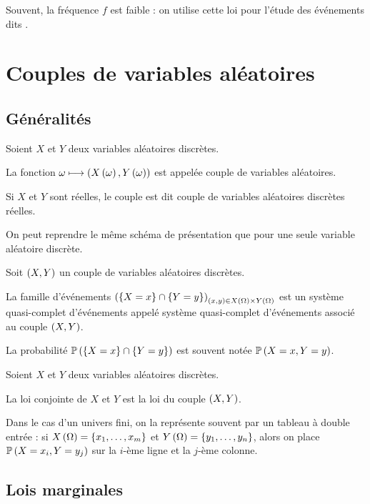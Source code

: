 Souvent, la fréquence \(f\) est faible : on utilise cette loi pour l'étude des événements dits .

\section{Couples de variables aléatoires}

\subsection{Généralités}

\begin{defi}
Soient \(X\) et \(Y\) deux variables aléatoires discrètes.

La fonction \(\omega\longmapsto\left(X\left(\omega\right),Y\left(\omega\right)\right)\) est appelée couple de variables aléatoires.

Si \(X\) et \(Y\) sont réelles, le couple est dit couple de variables aléatoires discrètes réelles.
\end{defi}

On peut reprendre le même schéma de présentation que pour une seule variable aléatoire discrète.

\begin{prop}
Soit \(\left(X,Y\right)\) un couple de variables aléatoires discrètes.

La famille d'événements \(\left(\left\lbrace X=x\right\rbrace\cap\left\lbrace Y=y\right\rbrace\right)_{\left(x,y\right)\in X\left(\Omega\right)\times Y\left(\Omega\right)}\) est un système quasi-complet d'événements appelé système quasi-complet d'événements associé au couple \(\left(X,Y\right)\).
\end{prop}

La probabilité \(\mathbb{P}\left(\left\lbrace X=x\right\rbrace\cap\left\lbrace Y=y\right\rbrace\right)\) est souvent notée \(\mathbb{P}\left(X=x,Y=y\right)\).

\begin{defi}
Soient \(X\) et \(Y\) deux variables aléatoires discrètes.

La loi conjointe de \(X\) et \(Y\) est la loi du couple \(\left(X,Y\right)\).
\end{defi}

Dans le cas d'un univers fini, on la représente souvent par un tableau à double entrée : si \(X\left(\Omega\right)=\left\lbrace x_1,\dots,x_m\right\rbrace\) et \(Y\left(\Omega\right)=\left\lbrace y_1,\dots,y_n\right\rbrace\), alors on place \(\mathbb{P}\left(X=x_i,Y=y_j\right)\) sur la \(i\)-ème ligne et la \(j\)-ème colonne.

\subsection{Lois marginales}

